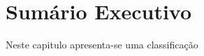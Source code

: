 \chapter{Sumário Executivo}
\label{chapter:sumario}

\begin{commentA}
	
\par \end{commentA}


Neste capitulo apresenta-se uma classificação 
